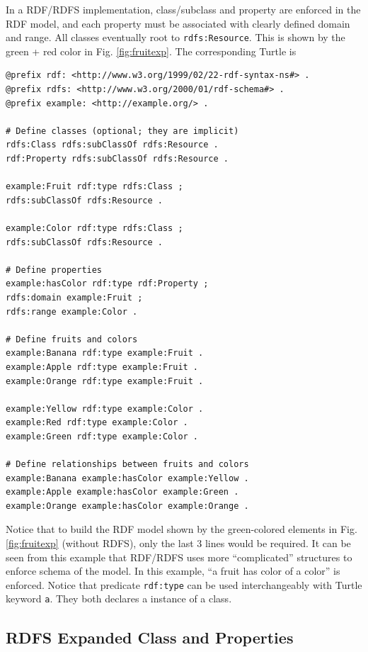 In a RDF/RDFS implementation, class/subclass and property are enforced in the RDF model, and each property must be associated with clearly defined domain and range. All classes eventually root to \verb|rdfs:Resource|. This is shown by the green + red color in Fig. \ref{fig:fruitexp}. The corresponding Turtle is
\begin{lstlisting}
@prefix rdf: <http://www.w3.org/1999/02/22-rdf-syntax-ns#> .
@prefix rdfs: <http://www.w3.org/2000/01/rdf-schema#> .
@prefix example: <http://example.org/> .

# Define classes (optional; they are implicit)
rdfs:Class rdfs:subClassOf rdfs:Resource .
rdf:Property rdfs:subClassOf rdfs:Resource .

example:Fruit rdf:type rdfs:Class ;
rdfs:subClassOf rdfs:Resource .

example:Color rdf:type rdfs:Class ;
rdfs:subClassOf rdfs:Resource .

# Define properties
example:hasColor rdf:type rdf:Property ;
rdfs:domain example:Fruit ;
rdfs:range example:Color .

# Define fruits and colors
example:Banana rdf:type example:Fruit .
example:Apple rdf:type example:Fruit .
example:Orange rdf:type example:Fruit .

example:Yellow rdf:type example:Color .
example:Red rdf:type example:Color .
example:Green rdf:type example:Color .

# Define relationships between fruits and colors
example:Banana example:hasColor example:Yellow .
example:Apple example:hasColor example:Green .
example:Orange example:hasColor example:Orange .

\end{lstlisting}
Notice that to build the RDF model shown by the green-colored elements in Fig. \ref{fig:fruitexp} (without RDFS), only the last 3 lines would be required. It can be seen from this example that RDF/RDFS uses more ``complicated'' structures to enforce schema of the model. In this example, ``a fruit has color of a color'' is enforced. Notice that predicate \verb|rdf:type| can be used interchangeably with Turtle keyword \verb|a|. They both declares a instance of a class.

\subsection{RDFS Expanded Class and Properties}

